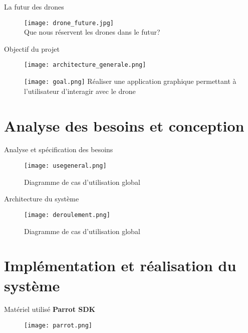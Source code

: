 \documentclass[french]{beamer}
\begin{document}
\begin{frame}[fragile]{La futur des drones}
\begin{figure}
\texttt{[image: drone\_future.jpg]} 
\\

Que nous réservent les drones dans le futur?
\end{figure}
\end{frame}



\begin{frame}[fragile]{Objectif du projet}
\begin{figure}
\texttt{[image: architecture\_generale.png]} 
\end{figure}
\begin{figure}
\texttt{[image: goal.png]} 
 Réaliser une application graphique permettant à l'utilisateur d’interagir avec le drone
\end{figure}
\end{frame}


\section{Analyse des besoins et conception}



\begin{frame}{Analyse et spécification des besoins}
\begin{figure}
 \texttt{[image: usegeneral.png]}
 \caption{Diagramme de cas d'utilisation global}
 \end{figure}
\end{frame}

\begin{frame}{Architecture du système}
\begin{figure}
 \texttt{[image: deroulement.png]}
 \caption{Diagramme de cas d'utilisation global}
 \end{figure}
\end{frame}

\section{Implémentation et réalisation du système}

\begin{frame}{Matériel utilisé}
\textbf{Parrot SDK}
\\
\begin{figure}
 \texttt{[image: parrot.png]}
\end{figure}
\end{frame}
\end{document}
